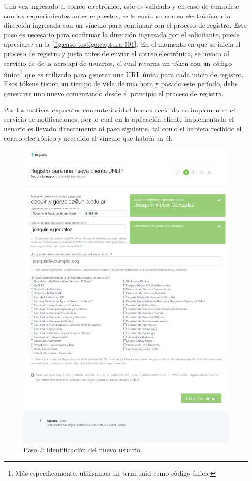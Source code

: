 Una vez ingresado el correo electrónico, este es validado y en caso de cumplirse con los requerimientos antes expuestos, se le envía un correo electrónico a la dirección ingresada con un vínculo para continuar con el proceso de registro. Este paso es necesario para confirmar la dirección ingresada por el solicitante, puede apreciarse en la \autoref{fig:caso-testigo:captura-001}. En el momento en que se inicia el proceso de registro y justo antes de enviar el correo electrónico, se invoca al servicio de  de la \gls{acro:api} de usuarios, el cual retorna un tóken con un código único\footnote{Más específicamente, utilizamos un \gls{term:uuid} como código único.} que es utilizado para generar una URL única para cada inicio de registro. Esos tókens tienen un tiempo de vida de una hora y pasado este período, debe generarse uno nuevo comenzando desde el principio el proceso de registro.

Por los motivos expuestos con anterioridad hemos decidido no implementar el servicio de notificaciones, por lo cual en la aplicación cliente implementada el usuario es llevado directamente al paso siguiente, tal como si hubiera recibido el correo electrónico y accedido al vínculo que habría en él.

\begin{figure}
  \centering
  \includegraphics[width=\textwidth,keepaspectratio]{src/images/05-capitulo-5/capturas/page_002.png}
  \caption{Paso 2: identificación del nuevo usuario}
  \label{fig:caso-testigo:captura-002}
\end{figure}

